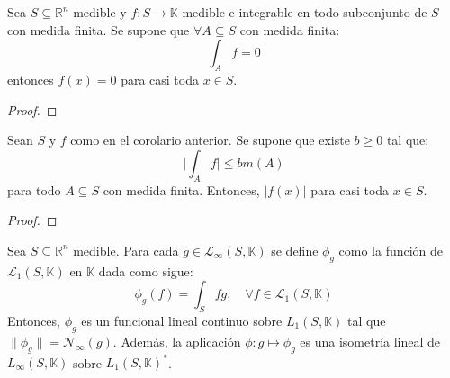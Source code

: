\documentclass[12pt]{report}
\newcounter{it}
\theoremstyle{largebreak}
\newcommand\cf[3]{\ensuremath{#1:#2\rightarrow#3}}
\newcommand\abs[1]{\ensuremath{\big|#1\big|}}
\newcommand\norm[1]{\ensuremath{\|#1\|}}
\newcommand{\N}[2]{\ensuremath{\mathcal{N}_{#1}\left(#2\right)}}
\begin{document}
    \begin{cor}
        Sea $S\subseteq\mathbb{R}^n$ medible y $\cf{f}{S}{\mathbb{K}}$ medible e integrable en todo subconjunto de $S$ con medida finita. Se supone que $\forall A\subseteq S$ con medida finita:
        \begin{equation*}
            \int_A f=0
        \end{equation*}
        entonces $f(x)=0$ para casi toda $x\in S$.
    \end{cor}

    \begin{proof}
        
    \end{proof}

    \begin{cor}
        Sean $S$ y $f$ como en el corolario anterior. Se supone que existe $b\geq 0$ tal que:
        \begin{equation*}
            \abs{\int_A f}\leq b m(A)
        \end{equation*}
        para todo $A\subseteq S$ con medida finita. Entonces, $\abs{f(x)}$ para casi toda $x\in S$.
    \end{cor}

    \begin{proof}
        
    \end{proof}

    \begin{theor}
        Sea $S\subseteq\mathbb{R}^n$ medible. Para cada $g\in\mathcal{L}_\infty(S,\mathbb{K})$ se define $\phi_g$ como la función de $\mathcal{L}_1(S,\mathbb{K})$ en $\mathbb{K}$ dada como sigue:
        \begin{equation*}
            \phi_g(f)=\int_S fg,\quad\forall f\in\mathcal{L}_1(S,\mathbb{K})
        \end{equation*}
        Entonces, $\phi_g$ es un funcional lineal continuo sobre $L_1(S,\mathbb{K})$ tal que $\norm{\phi_g}=\N{\infty}{g}$. Además, la aplicación $\phi:g\mapsto \phi_g$ es una isometría lineal de $L_\infty(S,\mathbb{K})$ sobre $L_1(S,\mathbb{K})^*$.
    \end{theor}
\end{document}
